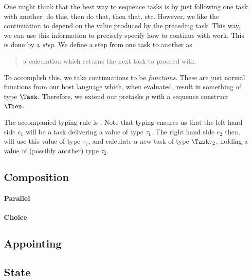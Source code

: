 One might think that the best way to sequence tasks is by just following one task with another:
do this, then do that, then that, etc.
However, we like the continuation to depend on the value produced by the preceding task.
This way, we can use this information to precisely specify how to continue with work.
This is done by a \emph{step}.
We define a step from one task to another as
\begin{quote}
  a calculation which returns the next task to proceed with.
\end{quote}

To accomplish this,
we take continuations to be \emph{functions}.
These are just normal functions from our host language which,
when evaluated, result in something of type $\Task$.
Therefore,
we extend our pretasks $p$ with a sequence construct $\Then$.

The accompanied typing rule is .
Note that typing ensures us that the left hand side $e_1$ will be a task delivering a value of type $\tau_1$.
The right hand side $e_2$ then, will use this value of type $\tau_1$,
and calculate a new task of type $\Task \tau_2$,
holding a value of (possibly another) type $\tau_2$.



\subsection{Composition}



\paragraph{Parallel}




\paragraph{Choice}




\subsection{Appointing}




\subsection{State}

